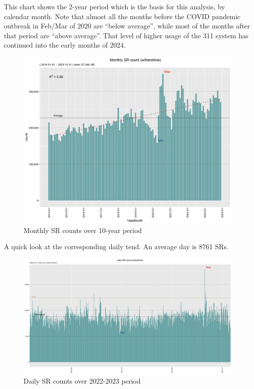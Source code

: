\documentclass[12pt, titlepage]{article}
\begin{document}
This chart shows the 2-year period which is the basis for this analysis, by calendar month. 
Note that almost all the months before the COVID pandemic outbreak in Feb/Mar
of 2020 are ``below average'', while most of the months after that period are ``above average''. That level of higher usage
of the 311 system has continued into the early months of 2024.

\begin{figure}[htbp]
  \centering
  \includegraphics[width=\textwidth]{Monthly.png}
  \caption{Monthly SR counts over 10-year period}
  \label{fig:monthly-counts}
\end{figure}

A quick look at the corresponding  daily tend.  An average day is 8761 SRs. 

\begin{figure}[H]
  \centering
  \includegraphics[width=\textwidth]{Daily.png}
  \caption{Daily SR counts over 2022-2023 period}
  \label{fig:daily-counts}
\end{figure}
\end{document}
